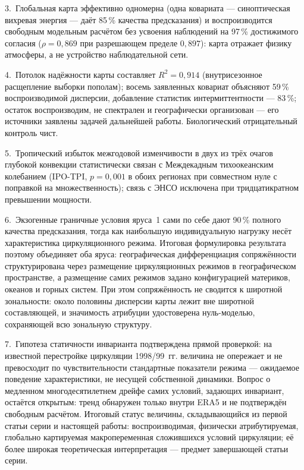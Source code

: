 \documentclass[11pt,a4paper]{article}
\begin{document}
3.~Глобальная карта эффективно одномерна (одна ковариата --- синоптическая вихревая энергия --- даёт 85\,\% качества предсказания) и воспроизводится свободным модельным расчётом без усвоения наблюдений на 97\,\% достижимого согласия ($\rho=0{,}869$ при разрешающем пределе $0{,}897$): карта отражает физику атмосферы, а не устройство наблюдательной сети.

4.~Потолок надёжности карты составляет $R^2=0{,}914$ (внутрисезонное расщепление выборки пополам); восемь заявленных ковариат объясняют 59\,\% воспроизводимой дисперсии, добавление статистик интермиттентности --- 83\,\%; остаток воспроизводим, не спектрален и географически организован --- его источники заявлены задачей дальнейшей работы. Биологический отрицательный контроль чист.

5.~Тропический избыток межгодовой изменчивости в двух из трёх очагов глубокой конвекции статистически связан с Междекадным тихоокеанским колебанием (IPO-TPI, $p=0{,}001$ в обоих регионах при совместном нуле с поправкой на множественность); связь с ЭНСО исключена при тридцатикратном превышении мощности.

6.~Экзогенные граничные условия яруса~1 сами по себе дают 90\,\% полного качества предсказания, тогда как наибольшую индивидуальную нагрузку несёт характеристика циркуляционного режима. Итоговая формулировка результата поэтому объединяет оба яруса: географическая дифференциация сопряжённости структурирована через размещение циркуляционных режимов в географическом пространстве, а размещение самих режимов задано конфигурацией материков, океанов и горных систем. При этом сопряжённость не сводится к широтной зональности: около половины дисперсии карты лежит вне широтной составляющей, и значимость атрибуции удостоверена нуль-моделью, сохраняющей всю зональную структуру.

7.~Гипотеза статичности инварианта подтверждена прямой проверкой: на известной перестройке циркуляции 1998/99~гг. величина не опережает и не превосходит по чувствительности стандартные показатели режима --- ожидаемое поведение характеристики, не несущей собственной динамики. Вопрос о медленном многодесятилетнем дрейфе самих условий, задающих инвариант, остаётся открытым: тренд обнаружен только внутри ERA5 и не подтверждён свободным расчётом. Итоговый статус величины, складывающийся из первой статьи серии и настоящей работы: воспроизводимая, физически атрибутируемая, глобально картируемая макропеременная сложившихся условий циркуляции; её более широкая теоретическая интерпретация --- предмет завершающей статьи серии.
\end{document}
